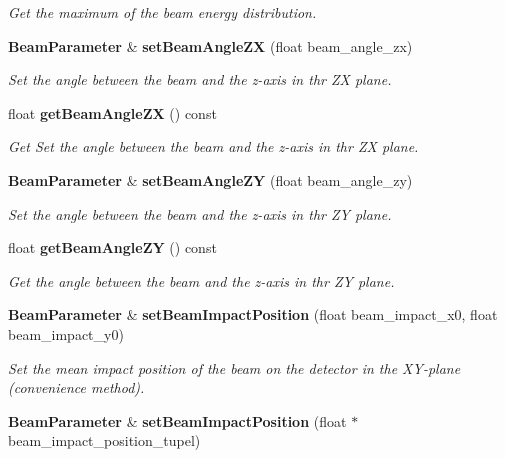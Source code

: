 \begin{DoxyCompactItemize}
\begin{DoxyCompactList}\small\item\em Get the maximum of the beam energy distribution. \end{DoxyCompactList}\item 
{\bf Beam\-Parameter} \& {\bf set\-Beam\-Angle\-Z\-X} (float beam\-\_\-angle\-\_\-zx)\label{classCALICE_1_1BeamParameter_ac1987bb9375229234b7bcd90c401f7bf}

\begin{DoxyCompactList}\small\item\em Set the angle between the beam and the z-\/axis in thr Z\-X plane. \end{DoxyCompactList}\item 
float {\bf get\-Beam\-Angle\-Z\-X} () const \label{classCALICE_1_1BeamParameter_a0521b37942f8761e317b7780450c746d}

\begin{DoxyCompactList}\small\item\em Get Set the angle between the beam and the z-\/axis in thr Z\-X plane. \end{DoxyCompactList}\item 
{\bf Beam\-Parameter} \& {\bf set\-Beam\-Angle\-Z\-Y} (float beam\-\_\-angle\-\_\-zy)\label{classCALICE_1_1BeamParameter_a861b31336d44f2084a325c3968eaa9bb}

\begin{DoxyCompactList}\small\item\em Set the angle between the beam and the z-\/axis in thr Z\-Y plane. \end{DoxyCompactList}\item 
float {\bf get\-Beam\-Angle\-Z\-Y} () const \label{classCALICE_1_1BeamParameter_ac32fcba57ab64d4fcfd704bfc2ef627e}

\begin{DoxyCompactList}\small\item\em Get the angle between the beam and the z-\/axis in thr Z\-Y plane. \end{DoxyCompactList}\item 
{\bf Beam\-Parameter} \& {\bf set\-Beam\-Impact\-Position} (float beam\-\_\-impact\-\_\-x0, float beam\-\_\-impact\-\_\-y0)\label{classCALICE_1_1BeamParameter_a0e5034d96cf4bad36b3e8757c5b57700}

\begin{DoxyCompactList}\small\item\em Set the mean impact position of the beam on the detector in the X\-Y-\/plane (convenience method). \end{DoxyCompactList}\item 
{\bf Beam\-Parameter} \& {\bf set\-Beam\-Impact\-Position} (float $\ast$beam\-\_\-impact\-\_\-position\-\_\-tupel)\label{classCALICE_1_1BeamParameter_ac9bbf019b9a990aa64762c4f8383a235}


\end{DoxyCompactItemize}
